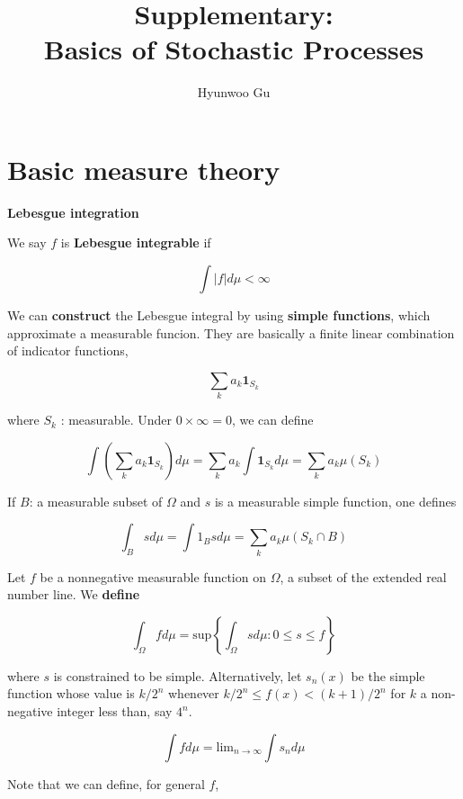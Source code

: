 \documentclass[12pt]{article}
\theoremstyle{nonumberbreak}
\begin{document}
\title{\textbf{Supplementary: \\ Basics of Stochastic Processes}}
\author{Hyunwoo Gu}
\date{}

\maketitle



\section{Basic measure theory}

\textbf{Lebesgue integration}

We say $f$ is \textbf{Lebesgue integrable} if 

$$
\int |f| d\mu < \infty
$$ 

We can \textbf{construct} the Lebesgue integral by using \textbf{simple functions}, which approximate a measurable funcion. They are basically a finite linear combination of indicator functions,

$$
\sum_k a_k \mathbf{1}_{S_k}
$$

where $S_k$ : measurable. Under $0 \times \infty =0$, we can define

$$
\int \left( \sum_k a_k \mathbf{1}_{S_k} \right) d\mu= \sum_k a_k \int \mathbf{1}_{S_k} d\mu = \sum_k a_k \mu(S_k)
$$

If $B$: a measurable subset of $\Omega$ and $s$ is a measurable simple function, one defines

$$
\int_B s d\mu = \int 1_B s d\mu = \sum_k a_k
 \mu(S_k \cap B)$$

Let $f$ be a nonnegative measurable function on $\Omega$, a subset of the extended real number line. We \textbf{define}

$$
\int_\Omega f d\mu = \mathrm{sup} \left\{ \int_\Omega s d\mu : 0 \le s \le f \right\}
$$

where $s$ is constrained to be simple. Alternatively, let $s_n(x)$ be the simple function whose value is $k/2^n$ whenever $k/2^n \le f(x) < (k+1)/2^n$ for $k$ a non-negative integer less than, say $4^n$. 

$$
\int f d\mu = \mathrm{lim}_{n\to\infty} \int s_n d\mu
$$

Note that we can define, for general $f$,
\end{document}
